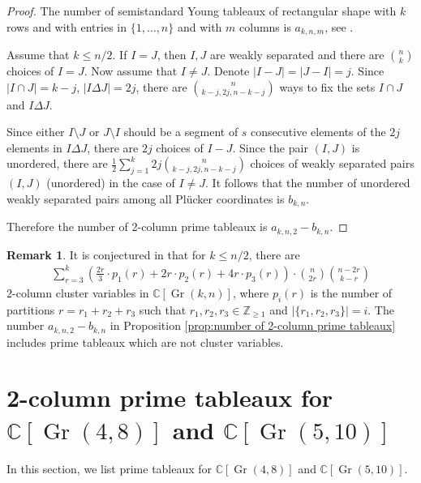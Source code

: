 \documentclass[12pt, reqno]{amsart}
\theoremstyle{plain}
\theoremstyle{definition}
\newtheorem{remark}[theorem]{Remark}
\numberwithin{equation}{section}
\newcommand{\CC}{{\mathbb {C}}}
\newcommand{\ZZ}{{\mathbb {Z}}}
\DeclareMathOperator{\Gr}{Gr}
\begin{document}
\begin{proof}
The number of semistandard Young tableaux of rectangular shape with $k$ rows and with entries in $\{1,\ldots,n\}$ and with $m$ columns is $a_{k,n,m}$, see \cite{Sta99}. 

Assume that $k \le n/2$. If $I=J$, then $I, J$ are weakly separated and there are $\binom{n}{k}$ choices of $I=J$. Now assume that $I \ne J$. Denote $|I-J|=|J-I|=j$. Since $|I \cap J|=k-j$, $|I \Delta J|=2j$, there are $\genfrac{(}{)}{0pt}{}{n}{k-j, 2j, n-k-j}$ ways to fix the sets $I \cap J$ and $I \Delta J$. 

Since either $I \setminus J$ or $J \setminus I$ should be a segment of $s$ consecutive elements of the $2j$ elements in $I \Delta J$, there are $2j$ choices of $I - J$. Since the pair $(I, J)$ is unordered, there are $\frac{1}{2} \sum_{j=1}^{k} 2 j \genfrac{(}{)}{0pt}{}{n}{k-j, 2j, n-k-j}$ choices of weakly separated pairs $(I, J)$ (unordered) in the case of $I \ne J$. It follows that the number of unordered weakly separated pairs among all Pl\"{u}cker coordinates is $b_{k,n}$. 

Therefore the number of 2-column prime tableaux is $a_{k,n,2}-b_{k,n}$.
\end{proof}

\begin{remark}
It is conjectured in \cite{BBGL} that for $k \le n/2$, there are 
\begin{align*}
\sum_{r=3}^{k} \left( \frac{2r}{3} \cdot p_1(r) +  2r \cdot p_2(r) + 4r \cdot p_3(r) \right) \cdot \binom{n}{2r} \binom{n-2r}{k-r}
\end{align*} 
$2$-column cluster variables in $\CC[\Gr(k,n)]$, where $p_i(r)$ is the number of partitions $r=r_1+r_2+r_3$ such that $r_1,r_2,r_3 \in \ZZ_{\ge 1}$ and $|\{r_1,r_2,r_3\}|=i$. The number $a_{k,n,2}-b_{k,n}$ in Proposition \ref{prop:number of 2-column prime tableaux} includes prime tableaux which are not cluster variables. 
\end{remark}

\section{\texorpdfstring{2-column prime tableaux for $\CC[\Gr(4,8)]$ and $\CC[\Gr(5,10)]$}{2-column prime tableaux for CC[Gr(4,8)] and CC[Gr(5,10)]}}
\label{sec:2-column prime tableaux in Gr48 and Gr510}

In this section, we list prime tableaux for $\CC[\Gr(4,8)]$ and $\CC[\Gr(5,10)]$.
\end{document}
